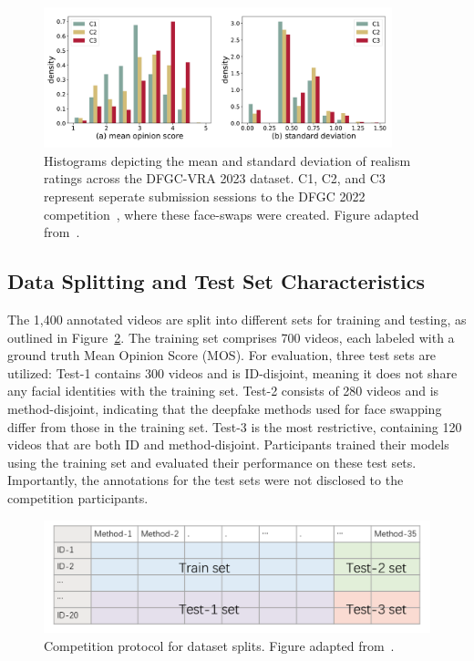 \documentclass[a4paper,12pt,openright]{book}
\begin{document}
\begin{figure}[!htb]
    \centering
    \includegraphics[trim={1cm 1cm 0cm 0cm},clip,width=0.9\textwidth]{images/mos-lines-scale-1000-gigapixel.png}
    \caption{Histograms depicting the mean and standard deviation of realism ratings across the DFGC-VRA 2023 dataset. C1, C2, and C3 represent seperate submission sessions to the DFGC 2022 competition~\cite{peng2022dfgc}, where these face-swaps were created. Figure adapted from~\cite{sun2023visual}.}
    \label{fig:MOS_distribution}
\end{figure}

\newpage
\subsection{Data Splitting and Test Set Characteristics}

The 1,400 annotated videos are split into different sets for training and testing, as outlined in Figure~\ref{fig:data_splitting}. The training set comprises 700 videos, each labeled with a ground truth Mean Opinion Score (MOS). For evaluation, three test sets are utilized: Test-1 contains 300 videos and is ID-disjoint, meaning it does not share any facial identities with the training set. Test-2 consists of 280 videos and is method-disjoint, indicating that the deepfake methods used for face swapping differ from those in the training set. Test-3 is the most restrictive, containing 120 videos that are both ID and method-disjoint. Participants trained their models using the training set and evaluated their performance on these test sets. Importantly, the annotations for the test sets were not disclosed to the competition participants.

\begin{figure}[H]
    \centering
    \includegraphics[trim={0.6cm 0cm 0.6cm 0cm},clip,width=\textwidth]{images/protocol.png}
    \caption{Competition protocol for dataset splits. Figure adapted from~\cite{peng_etal_2023}.}
    \label{fig:data_splitting}
\end{figure}
\end{document}
